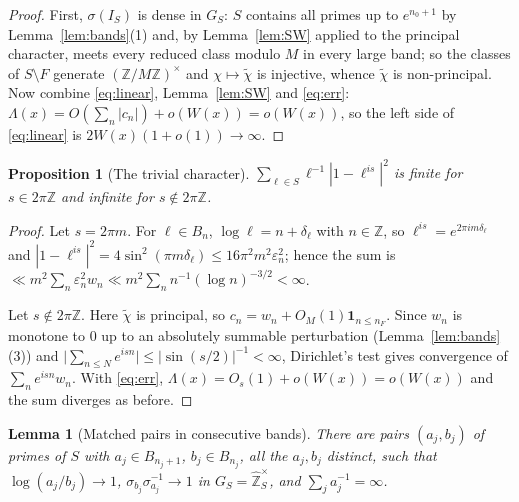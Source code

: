 \documentclass[11pt]{amsart}
\numberwithin{equation}{section}
\newtheorem{proposition}[theorem]{Proposition}
\newtheorem{lemma}[theorem]{Lemma}
\theoremstyle{definition}
\theoremstyle{remark}
\newcommand{\Z}{\mathbb{Z}}
\newcommand{\hZ}{\widehat{\mathbb{Z}}}
\begin{document}
\begin{proof}
First, $\sigma(I_S)$ is dense in $G_S$: $S$ contains all primes up to $e^{n_0+1}$ by
Lemma~\ref{lem:bands}(1) and, by Lemma~\ref{lem:SW} applied to the principal character, meets
every reduced class modulo $M$ in every large band; so the classes of $S\setminus F$ generate
$(\Z/M\Z)^\times$ and $\chi\mapsto\tilde\chi$ is injective, whence $\tilde\chi$ is
non-principal. Now combine \eqref{eq:linear}, Lemma~\ref{lem:SW} and \eqref{eq:err}:
$\Lambda(x)=O(\sum_n|c_n|)+o(W(x))=o(W(x))$, so the left side of \eqref{eq:linear} is
$2W(x)(1+o(1))\to\infty$.
\end{proof}

\begin{proposition}[The trivial character]\label{prop:trivialchi}
$\sum_{\ell\in S}\ell^{-1}|1-\ell^{is}|^2$ is finite for $s\in2\pi\Z$ and infinite for
$s\notin2\pi\Z$.
\end{proposition}

\begin{proof}
Let $s=2\pi m$. For $\ell\in B_n$, $\log\ell=n+\delta_\ell$ with $n\in\Z$, so
$\ell^{is}=e^{2\pi im\delta_\ell}$ and
$|1-\ell^{is}|^2=4\sin^2(\pi m\delta_\ell)\le16\pi^2m^2\varepsilon_n^2$; hence the sum is
$\ll m^2\sum_n\varepsilon_n^2w_n\ll m^2\sum_n n^{-1}(\log n)^{-3/2}<\infty$.

Let $s\notin2\pi\Z$. Here $\tilde\chi$ is principal, so $c_n=w_n+O_M(1)\mathbf 1_{n\le n_F}$.
Since $w_n$ is monotone to $0$ up to an absolutely summable perturbation
(Lemma~\ref{lem:bands}(3)) and
$\bigl|\sum_{n\le N}e^{isn}\bigr|\le|\sin(s/2)|^{-1}<\infty$, Dirichlet's test gives
convergence of $\sum_ne^{isn}w_n$. With \eqref{eq:err}, $\Lambda(x)=O_s(1)+o(W(x))=o(W(x))$
and the sum diverges as before.
\end{proof}

\begin{lemma}[Matched pairs in consecutive bands]\label{lem:matched}
There are pairs $(a_j,b_j)$ of primes of $S$ with $a_j\in B_{n_j+1}$, $b_j\in B_{n_j}$, all
the $a_j,b_j$ distinct, such that $\log(a_j/b_j)\to1$, $\sigma_{b_j}\sigma_{a_j}^{-1}\to1$ in
$G_S=\hZ_S^\times$, and $\sum_ja_j^{-1}=\infty$.
\end{lemma}
\end{document}
